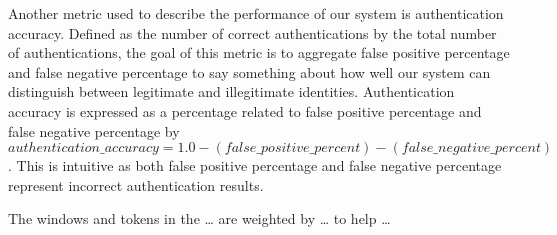
Another metric used to describe the performance of our system
is authentication accuracy.
%
Defined as the 
number of correct authentications by
the total number of authentications,
the goal of this metric is to
aggregate
false positive percentage and
false negative percentage 
to say something about how well our system can distinguish between
legitimate and illegitimate identities.
%
Authentication accuracy is 
expressed as a percentage
related to 
false positive percentage and
false negative percentage by
$authentication\_accuracy = 1.0 - (false\_positive\_percent) - (false\_negative\_percent)$.
%
This is intuitive as both 
false positive percentage and
false negative percentage 
represent incorrect authentication results.



%





%
The windows and tokens in the \dots 
are weighted by \dots
to help \dots



